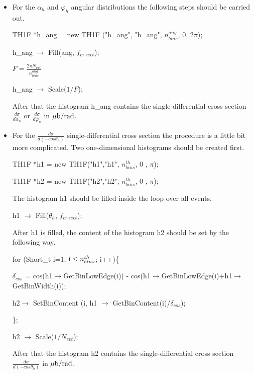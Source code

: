 \begin{enumerate}
\begin{itemize}
\item For the $\alpha_{h}$ and $\varphi_{h}$ angular distributions the following steps should be carried out.

TH1F *h\_ang = new TH1F ("h\_ang", "h\_ang", $n_{bins}^{ang}$, 0, $2\pi$);

h\_ang $\rightarrow$ Fill(ang, $f_{cr~sect}$);

$F = \frac{2\pi N_{evt}}{n_{bins}^{ang}}$

h\_ang $\rightarrow$ Scale($1/F$);

After that the histogram h\_ang contains the single-differential cross section $\frac{d\sigma}{d\alpha_{h}}$ or $\frac{d\sigma}{d\varphi_{h}}$  in $\mu{\rm b/rad}$.

\item For the $\frac{d\sigma}{d(-cos\theta_{h})}$ single-differential cross section the procedure is a little bit more complicated. Two one-dimensional histograms should be created first.

TH1F *h1 = new TH1F("h1","h1", $n_{bins}^{th}$, 0 , $\pi$); 
 
TH1F *h2 = new TH1F("h2","h2", $n_{bins}^{th}$, 0 , $\pi$);

The histogram h1 should be filled inside the loop over all events.

h1 $\rightarrow$ Fill($\theta_{h}$, $f_{cr~sect}$);

After h1 is filled, the content of the histogram h2 should be set by the following way.

 for (Short\_t i=1; ${\rm i}\leq n_{bins}^{th}$; i++)\{

$\delta_{cos}$ = cos(h1$\rightarrow$GetBinLowEdge(i)) - cos(h1$\rightarrow$GetBinLowEdge(i)+h1$\rightarrow$GetBinWidth(i));

h2$\rightarrow$  SetBinContent (i, h1 $\rightarrow$ GetBinContent(i)/$\delta_{cos}$);

     \};



h2 $\rightarrow$ Scale($1/N_{evt}$);

 After that the histogram h2 contains the single-differential cross section $\frac{d\sigma}{d(-cos\theta_{h})}$  in $\mu{\rm b/rad}$.

\end{itemize}


\end{enumerate}


